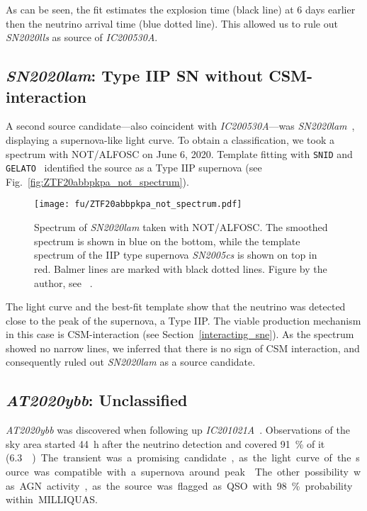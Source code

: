 As can be seen, the fit estimates the explosion time (black line) at 6 days earlier then the neutrino arrival time (blue dotted line). This allowed us to rule out \emph{SN2020lls} as source of \emph{IC200530A}.

\subsection{\emph{SN2020lam}: Type IIP SN without CSM-interaction}\label{SN2020lam}
A second source candidate---also coincident with \emph{IC200530A}---was \emph{SN2020lam}~, displaying a supernova-like light curve. To obtain a classification, we took a spectrum with NOT/ALFOSC on June 6, 2020. Template fitting with \texttt{SNID} and \texttt{GELATO}~ identified the source as a Type IIP supernova (see Fig.~\ref{fig:ZTF20abbpkpa_not_spectrum}).

\begin{figure}[h!]
    \texttt{[image: fu/ZTF20abbpkpa\_not\_spectrum.pdf]}
    \caption[\emph{SN2020lam} spectrum]{Spectrum of \emph{SN2020lam} taken with NOT/ALFOSC. The smoothed spectrum is shown in blue on the bottom, while the template spectrum of the IIP type supernova \emph{SN2005cs} is shown on top in red. Balmer lines are marked with black dotted lines. Figure by the author, see ~\cite{Stein2023a}.}
\end{figure}

The light curve and the best-fit template show that the neutrino was detected close to the peak of the supernova, a Type IIP. The viable production mechanism in this case is CSM-interaction (see Section~\ref{interacting_sne}). As the spectrum showed no narrow lines, we inferred that there is no sign of CSM interaction, and consequently ruled out \emph{SN2020lam} as a source candidate.

\subsection{\emph{AT2020ybb}: Unclassified}
\emph{AT2020ybb} was discovered when following up \emph{IC201021A}~. Observations of the sky area started \SI{44}{\hour} after the neutrino detection and covered \SI{91}{\percent} of it (\SI{6.3}{\square\deg}). The transient was a promising candidate, as the light curve of the source was compatible with a supernova around peak~. The other possibility was AGN activity, as the source was flagged as QSO with \SI{98}{\percent} probability within MILLIQUAS.

